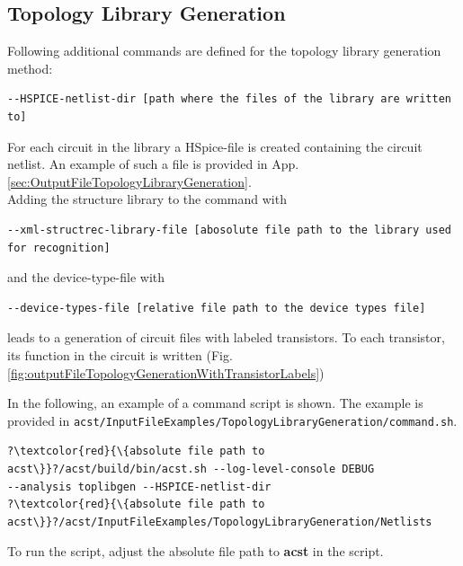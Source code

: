 \subsection{Topology Library Generation}\label{sec:commandsTopologyLibraryGeneration}
Following additional commands are defined for the topology library generation method:
\\

\begin{lstlisting}[basicstyle=\ttfamily\scriptsize,backgroundcolor={\color{gray!30}}, escapechar=? ]
--HSPICE-netlist-dir [path where the files of the library are written to]
\end{lstlisting}
For each circuit in the library a HSpice-file is created containing the circuit netlist. An example of such a file is provided in App. \ref{sec:OutputFileTopologyLibraryGeneration}.
\\

Adding the structure library to the command with
\begin{lstlisting}[basicstyle=\ttfamily\scriptsize,backgroundcolor={\color{gray!30}}, escapechar=? ]
--xml-structrec-library-file [abosolute file path to the library used for recognition] 
\end{lstlisting}
and the device-type-file with
\begin{lstlisting}[basicstyle=\ttfamily\scriptsize,backgroundcolor={\color{gray!30}}, escapechar=? ]
--device-types-file [relative file path to the device types file]
\end{lstlisting}
leads to a generation of circuit files with labeled transistors. To each transistor, its function in the circuit is written (Fig. \ref{fig:outputFileTopologyGenerationWithTransistorLabels})



In the following, an example of a command script is shown. The example is provided in {\tt acst/InputFileExamples/TopologyLibraryGeneration/command.sh}.
\begin{lstlisting}[basicstyle=\ttfamily\scriptsize,backgroundcolor={\color{gray!30}}, escapechar=? ]
?\textcolor{red}{\{absolute file path to acst\}}?/acst/build/bin/acst.sh --log-level-console DEBUG 
--analysis toplibgen --HSPICE-netlist-dir 
?\textcolor{red}{\{absolute file path to acst\}}?/acst/InputFileExamples/TopologyLibraryGeneration/Netlists
\end{lstlisting}
To run the script, adjust the absolute file path to {\bf acst} in the script.


